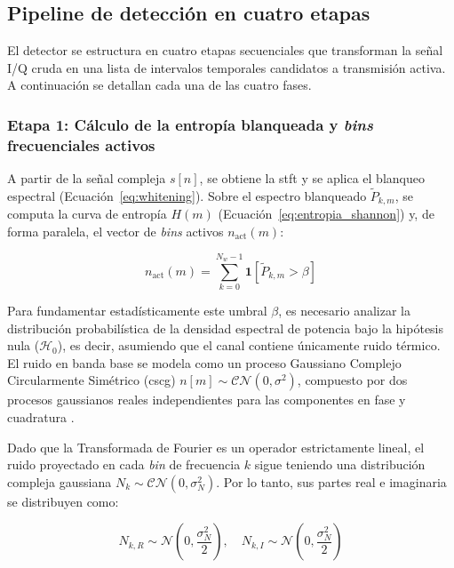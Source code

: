 \subsection{Pipeline de detección en cuatro etapas}
\label{subsec:pipeline_detector}

El detector se estructura en cuatro etapas secuenciales que transforman la señal I/Q cruda en una lista de intervalos temporales candidatos a transmisión activa. A continuación se detallan cada una de las cuatro fases.

\subsubsection{Etapa 1: Cálculo de la entropía blanqueada y \textit{bins} frecuenciales activos}

A partir de la señal compleja $s[n]$, se obtiene la \gls{stft} y se aplica el blanqueo espectral (Ecuación~\ref{eq:whitening}). Sobre el espectro blanqueado $\tilde{P}_{k,m}$, se computa la curva de entropía $H(m)$ (Ecuación~\ref{eq:entropia_shannon}) y, de forma paralela, el vector de \textit{bins} activos $n_{\text{act}}(m)$:

\begin{equation}
    n_{\text{act}}(m) = \sum_{k=0}^{N_w-1} \mathbf{1}\!\left[\tilde{P}_{k,m} > \beta\right]
    \label{eq:bins_activos}
\end{equation}

Para fundamentar estadísticamente este umbral $\beta$, es necesario analizar la distribución probabilística de la densidad espectral de potencia bajo la hipótesis nula ($\mathcal{H}_0$), es decir, asumiendo que el canal contiene únicamente ruido térmico. El ruido en banda base se modela como un proceso Gaussiano Complejo Circularmente Simétrico (\gls{cscg}) $n[m] \sim \mathcal{CN}(0, \sigma^2)$, compuesto por dos procesos gaussianos reales independientes para las componentes en fase y cuadratura \cite{kay_fundamentals_1998}.

Dado que la Transformada de Fourier es un operador estrictamente lineal, el ruido proyectado en cada \textit{bin} de frecuencia $k$ sigue teniendo una distribución compleja gaussiana $N_k \sim \mathcal{CN}(0, \sigma_N^2)$. Por lo tanto, sus partes real e imaginaria se distribuyen como:

\begin{equation}
    N_{k,R} \sim \mathcal{N}\left(0, \frac{\sigma_N^2}{2}\right), \quad N_{k,I} \sim \mathcal{N}\left(0, \frac{\sigma_N^2}{2}\right)
\end{equation}

